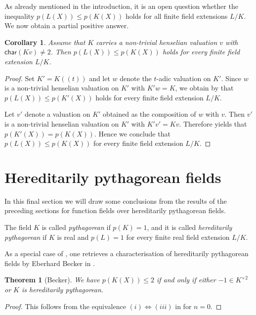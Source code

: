 \documentclass[12pt,leqno]{amsart}
\newcommand{\sq}[1]{#1^{\times 2}}
\newcommand{\car}{\mathsf{char}}
\renewcommand{\leq}{\leqslant}
\numberwithin{equation}{section}
\newtheorem{thm}[equation]{Theorem}
\newtheorem{cor}[equation]{Corollary}
\theoremstyle{definition}
\theoremstyle{plain}
\begin{document}
As already mentioned in the introduction, it is an open question whether the inequality $p(L(X))\leq p(K(X))$ holds for all finite field extensions $L/K$.
We now obtain a partial positive answer.

\begin{cor}\label{C:pyth-rafufi-finite-extension}
Assume that $K$ carries a non-trivial henselian valuation $v$ with $\car(Kv)\neq 2$.
Then $p(L(X))\leq p(K(X))$ holds for every finite field extension $L/K$.
\end{cor}
\begin{proof}
Set $K'=K(\!(t)\!)$ and let $w$ denote the $t$-adic valuation on $K'$.
Since $w$ is a non-trivial henselian valuation on $K'$ with $K'w=K$, we obtain by  that $p(L(X))\leq p(K'(X))$ holds for every finite field extension $L/K$.
    
Let $v'$ denote a valuation on $K'$ obtained as the composition of $w$ with $v$.
Then $v'$ is a non-trivial henselian valuation on $K'$ with $K'v'=Kv$.
Therefore  yields that $p(K'(X))=p(K(X))$.
Hence we conclude that $p(L(X))\leq p(K(X))$ for every finite field extension $L/K$.
\end{proof}

\section{Hereditarily pythagorean fields} %

\label{Section HPF}

In this final section we will draw some conclusions from the results of the preceding sections for function fields over hereditarily pythagorean fields.

The field $K$ is called \emph{pythagorean} if $p(K)=1$, and it is called \emph{hereditarily pythagorean} if $K$ is real and $p(L)=1$ for every finite real field extension $L/K$.

As a special case of , one retrieves a characterisation of hereditarily pythagorean fields by Eberhard Becker in \cite[Chap.~III, Theorem 4]{Bec78}.

\begin{thm}[Becker]
\label{T:Becker}
We have $p(K(X))\leq 2$ if and only if either $-1\in\sq{K}$ or $K$ is hereditarily pythagorean.
\end{thm}
\begin{proof}
This follows from the equivalence $(i)\Leftrightarrow(iii)$ in 
  for $n=0$.
\end{proof}
\end{document}
